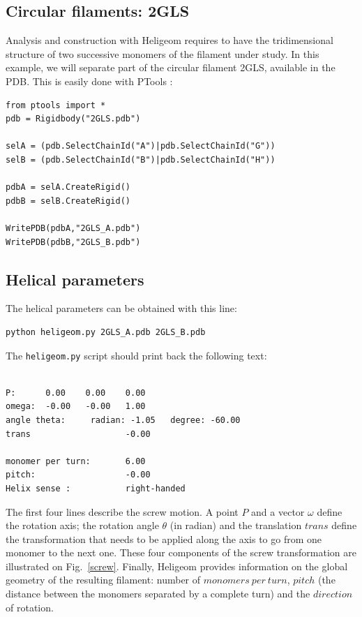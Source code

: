\documentclass[12pt,a4paper]{article}
\begin{document}
\subsection{Circular filaments: 2GLS}
Analysis and construction with Heligeom requires to have the tridimensional structure of two successive monomers of the filament under study. 
In this example, we will separate part of the circular filament 2GLS, available in the PDB. This is easily done with PTools :
\begin{verbatim}
from ptools import *
pdb = Rigidbody("2GLS.pdb")

selA = (pdb.SelectChainId("A")|pdb.SelectChainId("G"))
selB = (pdb.SelectChainId("B")|pdb.SelectChainId("H"))

pdbA = selA.CreateRigid()
pdbB = selB.CreateRigid()

WritePDB(pdbA,"2GLS_A.pdb")
WritePDB(pdbB,"2GLS_B.pdb")
\end{verbatim}

\subsection{Helical parameters}
The helical parameters can be obtained with this line:
\begin{verbatim}
python heligeom.py 2GLS_A.pdb 2GLS_B.pdb
\end{verbatim}
The \texttt{heligeom.py} script should print back the following text:

% 
\begin{verbatim}

P:      0.00    0.00    0.00
omega:  -0.00   -0.00   1.00
angle theta:     radian: -1.05   degree: -60.00
trans                   -0.00

monomer per turn:       6.00
pitch:                  -0.00
Helix sense :           right-handed

\end{verbatim}

The first four lines describe the screw motion. 
A point $P$ and a vector $\omega$ define the rotation axis; 
the rotation angle $\theta$ (in radian) and the translation $trans$ define the transformation that needs to be applied along the axis to go from one monomer to the next one. 
These four components of the screw transformation are illustrated on Fig.~\ref{screw}. 
Finally, Heligeom provides information on the global geometry of the resulting filament: 
number of $monomers~per~turn$, $pitch$ (the distance between the monomers separated by a complete turn) and the $direction$ of rotation.
\end{document}
